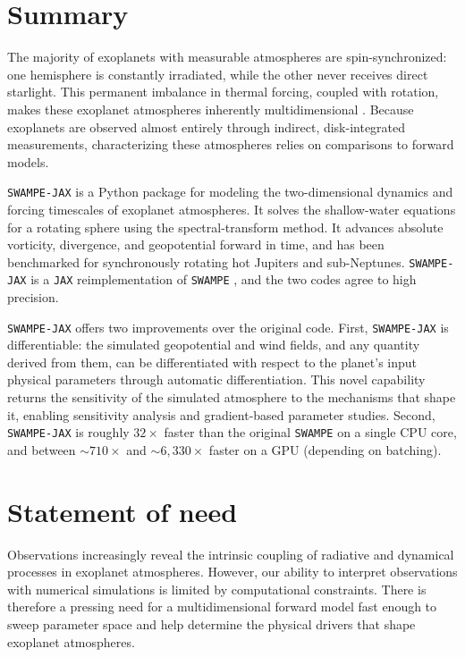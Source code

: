 \documentclass[10pt,a4paper,onecolumn]{article}
\begin{document}
\section{Summary}

The majority of exoplanets with measurable atmospheres are spin-synchronized: one
hemisphere is constantly irradiated, while the other never receives direct
starlight. This permanent imbalance in thermal forcing, coupled with rotation,
makes these exoplanet atmospheres inherently multidimensional \citep{Showman:2009}. 
Because exoplanets are observed almost entirely through indirect,
disk-integrated measurements, characterizing these atmospheres relies on
comparisons to forward models.

\texttt{SWAMPE-JAX} is a Python package for modeling the two-dimensional dynamics
and forcing timescales of exoplanet atmospheres. It solves the shallow-water
equations for a rotating sphere using the spectral-transform method. It advances
absolute vorticity, divergence, and geopotential forward in time, and has been
benchmarked for synchronously rotating hot Jupiters and sub-Neptunes.
\texttt{SWAMPE-JAX} is a \texttt{JAX} \citep{jax:2018} reimplementation of
\texttt{SWAMPE} \citep{Landgren:2022}, and the two codes agree to high precision.

\texttt{SWAMPE-JAX} offers two improvements over the original code. 
First, \texttt{SWAMPE-JAX} is differentiable: the simulated geopotential and wind fields,
and any quantity derived from them, can be differentiated with respect to the
planet's input physical parameters through automatic differentiation. This novel
capability returns the sensitivity of the simulated atmosphere to the
mechanisms that shape it,
enabling sensitivity analysis and gradient-based parameter studies.
Second, \texttt{SWAMPE-JAX} is roughly $32\times$ faster than the original \texttt{SWAMPE}
on a single CPU core, and between ${\sim}710\times$ and ${\sim}6{,}330\times$ faster
on a GPU (depending on batching).

\section{Statement of need}
Observations increasingly reveal the intrinsic coupling of radiative and dynamical 
processes in exoplanet atmospheres.
However, our ability to interpret observations with numerical simulations
is limited by computational constraints.
There is therefore a pressing need for a multidimensional
forward model fast enough to sweep parameter space and help determine the physical drivers
that shape exoplanet atmospheres.
\end{document}
